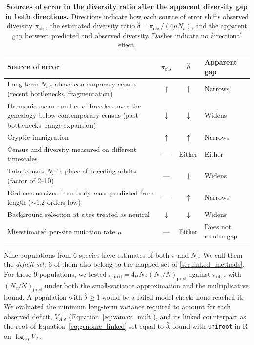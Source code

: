 \documentclass{article}
\begin{document}
\begin{table}[h!]
\centering
\caption{\textbf{Sources of error in the diversity ratio alter the apparent diversity gap in both directions.} Directions indicate how each source of error shifts observed diversity $\pi_\text{obs}$, the estimated diversity ratio $\hat{\delta} = \pi_\text{obs}/(4\mu N_c)$, and the apparent gap between predicted and observed diversity. Dashes indicate no directional effect.}
\label{tab:bias}
\small
\begin{tabular}{p{7.4cm}ccp{3.6cm}}
\toprule
Source of error & $\pi_\text{obs}$ & $\hat{\delta}$ & Apparent gap \\
\midrule
Long-term $N_{eC}$ above contemporary census (recent bottlenecks, fragmentation) & $\uparrow$ & $\uparrow$ & Narrows \\
Harmonic mean number of breeders over the genealogy below contemporary census (past bottlenecks, range expansion) & $\downarrow$ & $\downarrow$ & Widens \\
Cryptic immigration & $\uparrow$ & $\uparrow$ & Narrows \\
Census and diversity measured on different timescales & --- & Either & Either \\
Total census $N_c$ in place of breeding adults (factor of 2--10) & --- & $\downarrow$ & Widens \\
Bird census sizes from body mass predicted from length ($\sim 1.2$ orders low) & --- & $\uparrow$ & Narrows \\
Background selection at sites treated as neutral & $\downarrow$ & $\downarrow$ & Widens \\
Misestimated per-site mutation rate $\mu$ & --- & Either & Does not resolve gap \\
\bottomrule
\end{tabular}
\end{table}

Nine populations from 6 species have estimates of both $\pi$ and $N_c$. We call them the \emph{deficit set}; 6 of them also belong to the mapped set of \autoref{sec:linked_methods}. For these 9 populations, we tested $\pi_\text{pred} = 4\mu N_c\,(N_e/N)_\text{pred}$ against $\pi_\text{obs}$, with $(N_e/N)_\text{pred}$ under both the small-variance approximation and the multiplicative bound. A population with $\hat{\delta} \ge 1$ would be a failed model check; none reached it. We evaluated the minimum long-term variance required to account for each observed deficit, $V_{A,\delta}$ (Equation~\eqref{eq:vamax_mult}), and its linked counterpart as the root of Equation~\eqref{eq:genome_linked} set equal to $\hat{\delta}$, found with \texttt{uniroot} in R on $\log_{10} V_A$.
\end{document}

